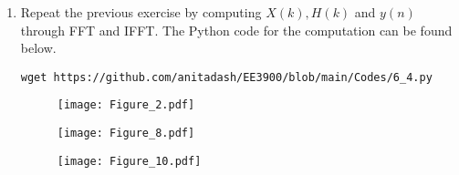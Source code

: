 \documentclass[journal,12pt,twocolumn]{IEEEtran}
\renewcommand\thesection{\arabic{section}}
\begin{document}
\begin{enumerate}[label=\thesection.\arabic*
,ref=\thesection.\theenumi]
\begin{figure}[!ht]
\begin{center}
\texttt{[image: Figure\_8.pdf]}
\end{center}
\label{fig:8}	
\end{figure}  
\item Repeat the previous exercise by computing $X(k), H(k)$ and $y(n)$ through FFT and 
IFFT.
\solution The Python code for the computation can be found below.
\begin{lstlisting}
wget https://github.com/anitadash/EE3900/blob/main/Codes/6_4.py
\end{lstlisting}
\begin{figure}[!ht]
\begin{center}
\texttt{[image: Figure\_2.pdf]}
\end{center}
\label{fig:9}	
\end{figure}
\begin{figure}[!ht]
\begin{center}
\texttt{[image: Figure\_8.pdf]}
\end{center}
\label{fig:10}	
\end{figure}
\begin{figure}[!ht]
\begin{center}
\texttt{[image: Figure\_10.pdf]}
\end{center}
\label{fig:11}	
\end{figure}
\end{enumerate}
\end{document}

